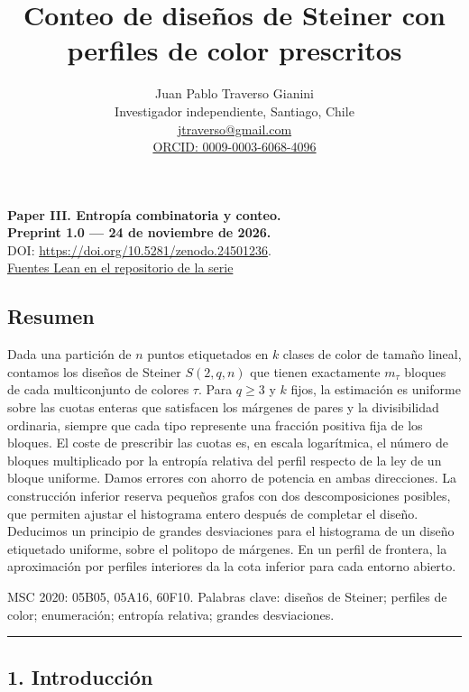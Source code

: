 \documentclass[spanish,11pt,a4paper]{article}
\title{Conteo de diseños de Steiner con perfiles de color prescritos}
\author{Juan Pablo Traverso Gianini\\\small Investigador independiente, Santiago, Chile\\\small \href{mailto:jtraverso@gmail.com}{jtraverso@gmail.com}\\\small \href{https://orcid.org/0009-0003-6068-4096}{ORCID: 0009-0003-6068-4096}}\date{}
\begin{document}
\raggedbottom\maketitle
\begin{center}
\textbf{Paper III. Entropía combinatoria y conteo.}\\
\textbf{Preprint 1.0 --- 24 de noviembre de 2026.}\\
DOI: \url{https://doi.org/10.5281/zenodo.24501236}.\\
\href{https://github.com/jtraverso/latinon-entropy-ldp/tree/main/preprints/STEINER-PROFILES/05_formalization/lean}{Fuentes Lean en el repositorio de la serie}\end{center}
\subsection{Resumen}\label{resumen}

Dada una partición de \(n\) puntos etiquetados en \(k\) clases de color de tamaño lineal, contamos los diseños de Steiner \(S(2,q,n)\) que tienen exactamente \(m_\tau\) bloques de cada multiconjunto de colores \(\tau\). Para \(q\ge3\) y \(k\) fijos, la estimación es uniforme sobre las cuotas enteras que satisfacen los márgenes de pares y la divisibilidad ordinaria, siempre que cada tipo represente una fracción positiva fija de los bloques. El coste de prescribir las cuotas es, en escala logarítmica, el número de bloques multiplicado por la entropía relativa del perfil respecto de la ley de un bloque uniforme. Damos errores con ahorro de potencia en ambas direcciones. La construcción inferior reserva pequeños grafos con dos descomposiciones posibles, que permiten ajustar el histograma entero después de completar el diseño. Deducimos un principio de grandes desviaciones para el histograma de un diseño etiquetado uniforme, sobre el politopo de márgenes. En un perfil de frontera, la aproximación por perfiles interiores da la cota inferior para cada entorno abierto.

MSC 2020: 05B05, 05A16, 60F10. Palabras clave: diseños de Steiner; perfiles de color; enumeración; entropía relativa; grandes desviaciones.

\begin{center}\rule{0.5\linewidth}{0.5pt}\end{center}

\subsection{1. Introducción}\label{introducciuxf3n}
\end{document}
